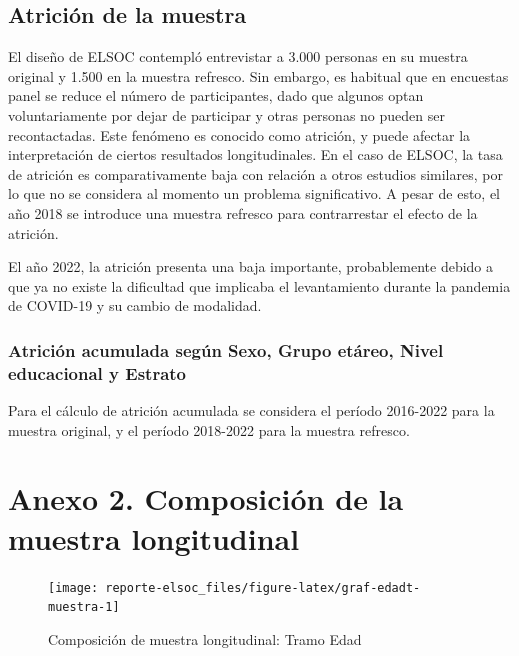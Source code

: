 \documentclass[
  12pt,
]{book}
\begin{document}
\hypertarget{atriciuxf3n-de-la-muestra}{%
\subsection*{Atrición de la muestra}\label{atriciuxf3n-de-la-muestra}}

El diseño de ELSOC contempló entrevistar a 3.000 personas en su muestra original y 1.500 en la muestra refresco. Sin embargo, es habitual que en encuestas panel se reduce el número de participantes, dado que algunos optan voluntariamente por dejar de participar y otras personas no pueden ser recontactadas. Este fenómeno es conocido como atrición, y puede afectar la interpretación de ciertos resultados longitudinales. En el caso de ELSOC, la tasa de atrición es comparativamente baja con relación a otros estudios similares, por lo que no se considera al momento un problema significativo. A pesar de esto, el año 2018 se introduce una muestra refresco para contrarrestar el efecto de la atrición.

El año 2022, la atrición presenta una baja importante, probablemente debido a que ya no existe la dificultad que implicaba el levantamiento durante la pandemia de COVID-19 y su cambio de modalidad.

\hypertarget{atriciuxf3n-acumulada-seguxfan-sexo-grupo-etuxe1reo-nivel-educacional-y-estrato}{%
\subsubsection*{Atrición acumulada según Sexo, Grupo etáreo, Nivel educacional y Estrato}\label{atriciuxf3n-acumulada-seguxfan-sexo-grupo-etuxe1reo-nivel-educacional-y-estrato}}

Para el cálculo de atrición acumulada se considera el período 2016-2022 para la muestra original, y el período 2018-2022 para la muestra refresco.

\hypertarget{anexo-2.-composiciuxf3n-de-la-muestra-longitudinal}{%
\section*{Anexo 2. Composición de la muestra longitudinal}\label{anexo-2.-composiciuxf3n-de-la-muestra-longitudinal}}

\begin{figure}

{\centering \texttt{[image: reporte-elsoc\_files/figure-latex/graf-edadt-muestra-1]} 

}

\caption{Composición de muestra longitudinal: Tramo Edad}\label{fig:graf-edadt-muestra}
\end{figure}
\end{document}

